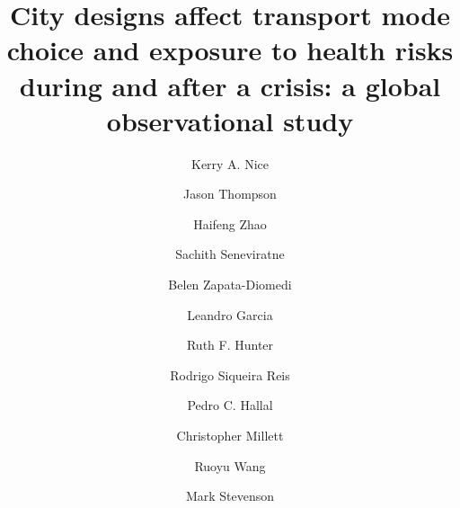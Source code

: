 \documentclass[preprint,10pt]{elsarticle} %
\begin{document}
\begin{frontmatter}

\title{City designs affect transport mode choice and exposure to health risks during and after a crisis: a global observational study}

\author[melb]{Kerry A. Nice}
\author[psychiatry,sun]{Jason Thompson}
\author[melb]{Haifeng Zhao}
\author[melb]{Sachith Seneviratne}
\author[RMII]{Belen Zapata-Diomedi}
\author[Belfast,phy]{Leandro Garcia}
\author[Belfast]{Ruth F. Hunter}
\author[wash]{Rodrigo Siqueira Reis}
\author[uill,PPE]{Pedro C. Hallal}
\author[imp,nova,ieps]{Christopher Millett}
\author[Belfast]{Ruoyu Wang}
\author[melb,eng]{Mark Stevenson}

\address[melb]{Transport, Health, and Urban Systems Research Lab, Faculty of Architecture, Building, and Planning, University of Melbourne, VIC, Australia}
\address[eng]{Faculty of Engineering and Information Technology and the Melbourne School of Population and Global Health, University of Melbourne, VIC, Australia}
\address[sun]{Centre for Human Factors and Sociotechnical Systems University of the Sunshine Coast, Queensland, Australia}
\address[psychiatry] {Department of Psychiatry, Faculty of Medicine, Dentistry and Health Sciences, The University of Melbourne, VIC, Australia}
\address[RMII]{Healthy Liveable Cities Lab, Centre for Urban Research, RMIT University, Melbourne, Australia}
\address[Belfast]{Centre for Public Health, Queen’s University Belfast, Institute of Clinical Sciences B, Belfast, Northern Ireland, UK}
\address[wash]{Washington University, St. Louis, Missouri, US}
\address[uill]{Department of Kinesiology and Community Health, University of Illinois Urbana-Champaign}
\address[imp]{Public Health Policy Evaluation Unit, School of Public Health, Imperial College London, London, United Kingdom}
\address[nova]{NOVA National School of Public Health, Public Health Research Centre, Comprehensive Health Research Center (CHRC), NOVA University Lisbon, Lisbon, Portugal}
\address[ieps]{Instituto de Estudos para Políticas de Saúde (IEPS), São Paulo, Brazil}
\address[PPE]{Postgraduate Program in Epidemiology, Federal University of Pelotas, Brazil}
\address[phy]{Physical Activity Epidemiology Group, University of São Paulo, São Paulo, Brazil}



\end{frontmatter}
\end{document}
